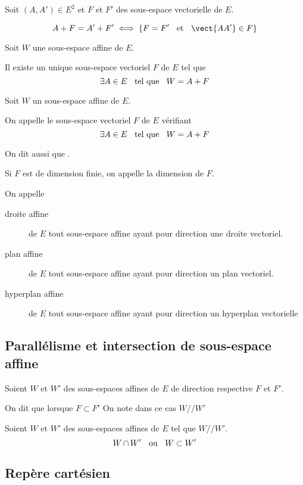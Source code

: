 
\begin{prp}
Soit $(A, A') \in E^2$ et $F$ et $F'$ des sous-espace vectorielle de
$E$.

\[
    A + F = A' + F' \iff \{ F = F' \et \vect{AA'} \in F \}
\]
\end{prp}

\begin{prp}
Soit $W$ une sous-espace affine de $E$.

Il existe un unique sous-espace vectoriel $F$ de $E$ tel que
\[
    \exists A \in E \;\;\text{ tel que }\;\; W = A + F
\]
\end{prp}

\begin{dfn}
Soit $W$ un sous-espace affine de $E$.

On appelle  le sous-espace vectoriel $F$ de $E$
vérifiant
\[
    \exists A \in E \;\;\text{ tel que }\;\; W = A + F
\]

On dit aussi que .

Si $F$ est de dimension finie, on appelle  la
dimension de $F$.

On appelle
\begin{description}
    \item[droite affine] de $E$ tout sous-espace affine ayant pour
        direction une droite vectoriel.
    \item[plan affine] de $E$ tout sous-espace affine ayant pour
        direction un plan vectoriel.
    \item[hyperplan affine] de $E$ tout sous-espace affine ayant pour
        direction un hyperplan vectorielle
\end{description}
\end{dfn}

\subsection{Parallélisme et intersection de sous-espace affine}

\begin{dfn}
Soient $W$ et $W'$ des sous-espaces affines de $E$ de direction
respective $F$ et $F'$.

On dit que  lorsque $F \subset F'$
On note dans ce cas $W // W'$
\end{dfn}

\begin{prp}
Soient $W$ et $W'$ des sous-espaces affines de $E$ tel que
$W // W'$.
\[
    W \operatorname{\cap} W' \;\;\text{ ou }\;\; W \subset W'
\]
\end{prp}

\subsection{Repère cartésien}
